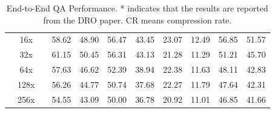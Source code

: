 \documentclass{applemlr}
\numberwithin{equation}{section}
\begin{document}
\begin{table}[!htbp]
\begin{tabular}{c|c|c|cc|cc|cc|cc}
 &  16x&  & 58.62 &  48.90 & 56.47 & 43.45 & 23.07 &12.49 & 56.85 & 51.57 \\

 & 32x &  & 61.15 & 50.45 & 56.31  & 43.13 & 21.28 &  11.29 & 51.21 &  45.70 \\

 & 64x &  & 57.63 &  46.62 & 52.39 & 38.94 & 22.38  & 11.63 & 48.11 & 42.83  \\

 & 128x &  & 56.26 & 44.77 & 50.74  & 37.68 & 22.27 & 11.79 & 47.64 &  42.31 \\

 & 256x &  & 54.55 &43.09 & 50.00 &  36.78 & 20.92 &  11.01 & 46.85 & 41.66  \\


\toprule
\end{tabular}
\caption{End-to-End QA Performance. * indicates that the results are reported from the DRO paper. CR means compression rate.}
\label{app:end-end-qa-mistral}
\end{table}
\end{document}
